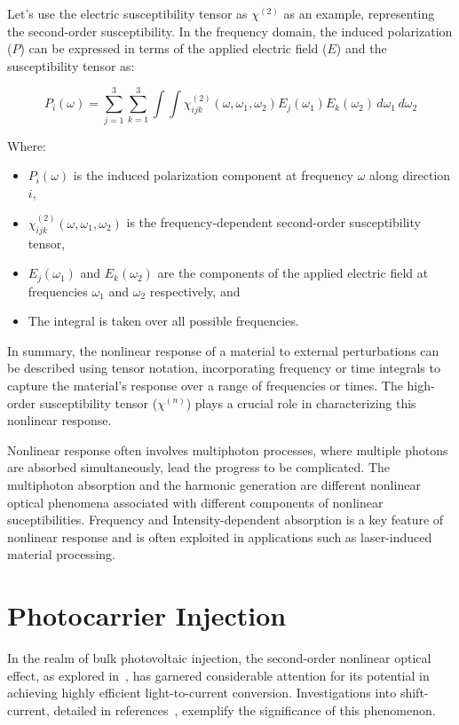 Let's use the electric susceptibility tensor as $\chi^{(2)}$ as an example, representing the second-order susceptibility. In the frequency domain, the induced polarization ($P$) can be expressed in terms of the applied electric field ($E$) and the susceptibility tensor as:

\[
	P_i(\omega) =  \sum_{j=1}^{3} \sum_{k=1}^{3}\int\int \chi^{(2)}_{ijk}(\omega, \omega_1, \omega_2) E_j(\omega_1) E_k(\omega_2) \, d\omega_1 \, d\omega_2
\]

Where:
\begin{itemize}
	\item $P_i(\omega)$ is the induced polarization component at frequency $\omega$ along direction
	      $i$,
	\item $\chi^{(2)}_{ijk}(\omega, \omega_1, \omega_2)$ is the frequency-dependent second-order susceptibility tensor,
	\item $E_j(\omega_1)$ and $E_k(\omega_2)$ are the components of the applied electric field at frequencies $\omega_1$ and $\omega_2$ respectively, and
	\item The integral is taken over all possible frequencies.
\end{itemize}

In summary, the nonlinear response of a material to external perturbations can be described using
tensor notation, incorporating frequency or time integrals to capture the material's response over
a range of frequencies or times. The high-order susceptibility tensor ($\chi^{(n)}$) plays a crucial role in characterizing this nonlinear response.


Nonlinear response often involves multiphoton processes, where multiple photons are absorbed
simultaneously, lead the progress to be complicated. The multiphoton absorption and the harmonic
generation are different nonlinear optical phenomena associated with different components of
nonlinear suceptibilities.
Frequency and Intensity-dependent absorption is a key feature of nonlinear response and is often exploited in applications such as laser-induced material processing.

\section{Photocarrier Injection}
In the realm of bulk photovoltaic injection, the second-order nonlinear optical effect, as explored in~\cite{PhysRevB.61.5337}, has garnered considerable attention for its potential in achieving highly efficient light-to-current conversion. Investigations into shift-current, detailed in references~\cite{PhysRevLett.107.126805,doi:10.1126/science.1168636,Yang2010,10.1063/5.0101513}, exemplify the significance of this phenomenon.

